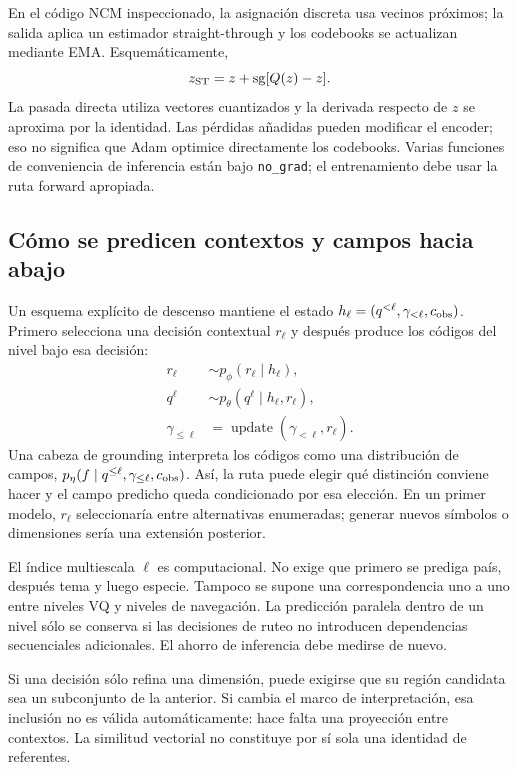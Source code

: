 \documentclass[11pt,a4paper]{article}
\newcommand{\sg}{\operatorname{sg}}
\begin{document}
En el código NCM inspeccionado, la asignación discreta usa vecinos próximos;
la salida aplica un estimador straight-through y los codebooks se actualizan
mediante EMA. Esquemáticamente,
\begin{equation}
 z_{\rm ST}=z+\sg[Q(z)-z].
\end{equation}
La pasada directa utiliza vectores cuantizados y la derivada respecto de $z$
se aproxima por la identidad. Las pérdidas añadidas pueden modificar el encoder;
eso no significa que Adam optimice directamente los codebooks. Varias funciones
de conveniencia de inferencia están bajo \texttt{no\_grad}; el entrenamiento debe
usar la ruta forward apropiada\cite{ncmcode}.

\subsection{Cómo se predicen contextos y campos hacia abajo}
Un esquema explícito de descenso mantiene el estado
$h_\ell=(q^{<\ell},\gamma_{<\ell},c_{\rm obs})$.
Primero selecciona una decisión contextual $r_\ell$ y después produce los códigos
del nivel bajo esa decisión:
\begin{align}
 r_\ell&\sim p_\phi(r_\ell\mid h_\ell),\\
 q^\ell&\sim p_\theta(q^\ell\mid h_\ell,r_\ell),\\
 \gamma_{\leq\ell}&=\operatorname{update}(\gamma_{<\ell},r_\ell).
\end{align}
Una cabeza de grounding interpreta los códigos como una distribución de campos,
$p_\eta(f\mid q^{\leq\ell},\gamma_{\leq\ell},c_{\rm obs})$. Así, la ruta puede
elegir qué distinción conviene hacer y el campo predicho queda condicionado por
esa elección. En un primer modelo, $r_\ell$ seleccionaría entre alternativas
enumeradas; generar nuevos símbolos o dimensiones sería una extensión posterior.

El índice multiescala $\ell$ es computacional. No exige que primero se prediga
país, después tema y luego especie. Tampoco se supone una correspondencia uno
a uno entre niveles VQ y niveles de navegación. La predicción paralela dentro
de un nivel sólo se conserva si las decisiones de ruteo no introducen dependencias
secuenciales adicionales. El ahorro de inferencia debe medirse de nuevo.

Si una decisión sólo refina una dimensión, puede exigirse que su región candidata
sea un subconjunto de la anterior. Si cambia el marco de interpretación, esa
inclusión no es válida automáticamente: hace falta una proyección entre contextos.
La similitud vectorial no constituye por sí sola una identidad de referentes.
\end{document}
